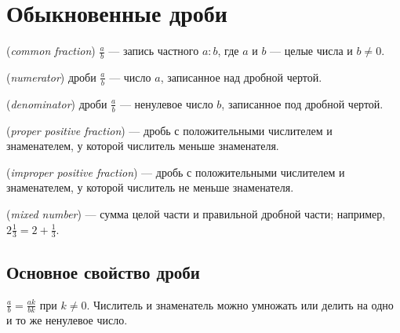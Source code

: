 \chapter{Обыкновенные дроби}\label{chap:c03}
\begin{definition} (\emph{common fraction}) \(\frac{a}{b}\) — запись частного \(a : b\), где \(a\) и \(b\) — целые числа и \(b \ne  0\).\end{definition}
\begin{definition} (\emph{numerator}) дроби \(\frac{a}{b}\) — число \(a\), записанное над дробной чертой.\end{definition}
\begin{definition} (\emph{denominator}) дроби \(\frac{a}{b}\) — ненулевое число \(b\), записанное под дробной чертой.\end{definition}
\begin{definition} (\emph{proper positive fraction}) — дробь с положительными числителем и знаменателем, у которой числитель меньше знаменателя.\end{definition}
\begin{definition} (\emph{improper positive fraction}) — дробь с положительными числителем и знаменателем, у которой числитель не меньше знаменателя.\end{definition}
\begin{definition} (\emph{mixed number}) — сумма целой части и правильной дробной части; например, \(2 \frac{1}{3} = 2 + \frac{1}{3}\).\end{definition}
\section{Основное свойство дроби}
\(\frac{a}{b} = \frac{ak}{bk}\) при \(k \ne  0\). Числитель и знаменатель можно умножать или делить на одно и то же ненулевое число.\par
